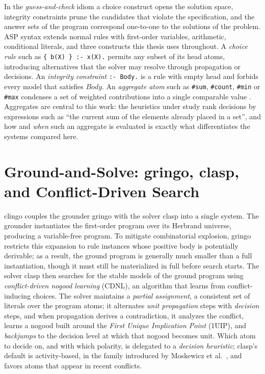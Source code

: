 In the \emph{guess-and-check} idiom a choice construct opens the solution space, integrity constraints prune the candidates that violate the specification, and the answer sets of the program correspond one-to-one to the solutions of the problem. ASP syntax extends normal rules with first-order variables, arithmetic, conditional literals, and three constructs this thesis uses throughout. 
A \emph{choice rule} such as \texttt{\{ b(X) \} :- x(X).} permits any subset of its head atoms, introducing alternatives that the solver may resolve through propagation or decisions.
An \emph{integrity constraint} \texttt{:- Body.} is a rule with empty head and forbids every model that satisfies $Body$. 
An \emph{aggregate atom} such as \texttt{\#sum}, \texttt{\#count}, \texttt{\#min} or \texttt{\#max} condenses a set of weighted contributions into a single comparable value \cite{clingoGuide}. Aggregates are central to this work: the heuristics under study rank decisions by expressions such as \enquote{the current sum of the elements already placed in a set}, and how and \emph{when} such an aggregate is evaluated is exactly what differentiates the systems compared here.

\section{Ground-and-Solve: gringo, clasp, and Conflict-Driven Search}
\label{sec:bg-cdcl}

clingo \cite{clingoGuide} couples the grounder gringo with the solver clasp into a single system.
The grounder instantiates the first-order program over its Herbrand universe, producing a variable-free program. To mitigate combinatorial explosion, gringo restricts this expansion to rule instances whose positive body is potentially derivable; as a result, the ground program is generally much smaller than a full instantiation, though it must still be materialized in full before search starts. 
The solver clasp \cite{gebser2007clasp} then searches for the stable models of the ground program using \emph{conflict-driven nogood learning} (CDNL), an algorithm that learns from conflict-inducing choices.
The solver maintains a \emph{partial assignment}, a consistent set of literals over the program atoms; it alternates \emph{unit propagation} steps with \emph{decision} steps, and when propagation derives a contradiction, it analyzes the conflict, learns a nogood built around the \emph{First Unique Implication Point} (1UIP), and \emph{backjumps} to the decision level at which that nogood becomes unit. Which atom to decide on, and with which polarity, is delegated to a \emph{decision heuristic}; clasp's default is activity-based, in the family introduced by Moskewicz et al.~\cite{moskewicz2001chaff}, and favors atoms that appear in recent conflicts.

